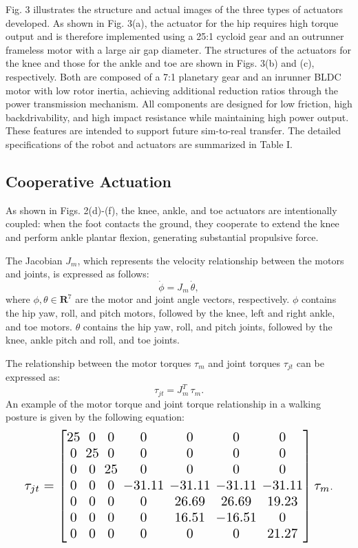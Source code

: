 \documentclass[10pt,twocolumn]{ICCAS}
\begin{document}
Fig. 3 illustrates the structure and actual images of the three
types of actuators developed. As shown in Fig. 3(a), the
actuator for the hip requires high torque output and is
therefore implemented using a 25:1 cycloid gear and an
outrunner frameless motor with a large air gap diameter. The
structures of the actuators for the knee and those for the ankle
and toe are shown in Figs. 3(b) and (c), respectively. Both are
composed of a 7:1 planetary gear and an inrunner BLDC
motor with low rotor inertia, achieving additional reduction
ratios through the power transmission mechanism. All
components are designed for low friction, high
backdrivability, and high impact resistance while maintaining
high power output. These features are intended to support
future sim-to-real transfer. The detailed specifications of
the robot and actuators are summarized in Table I.

\subsection{Cooperative Actuation}
As shown in Figs. 2(d)-(f), the knee, ankle, and toe actuators are intentionally coupled:
when the foot contacts the ground, they cooperate to extend the knee and perform ankle plantar flexion,
generating substantial propulsive force.

The Jacobian $J_m$, which represents the velocity relationship between the motors and joints, is expressed as follows:
\begin{equation}
    \dot{\phi} = J_m \, \dot{\theta},
    \label{eq:jacobian}
\end{equation}
where $\phi, \theta \in \mathbf{R}^{7}$ are the motor and joint angle vectors, respectively.
$\phi$ contains the hip yaw, roll, and pitch motors, followed by the knee, left and right ankle, 
and toe motors. $\theta$ contains the hip yaw, roll, and pitch joints, followed by the knee, ankle pitch and roll, 
and toe joints.

The relationship between the motor torques $\tau_m$ and joint torques $\tau_{jt}$ can be expressed as:
\begin{equation}
    \tau_{jt} = J_m^T \, \tau_m.
    \label{eq:torque}
\end{equation}
An example of the motor torque and joint torque relationship in a walking posture is given by the following equation:
\begin{equation}
    \resizebox{0.92\columnwidth}{!}{$
    \setlength{\arraycolsep}{2pt}
    \tau_{jt} =
    \begin{bmatrix}
    25 & 0 & 0 & 0 & 0 & 0 & 0 \\
    0 & 25 & 0 & 0 & 0 & 0 & 0 \\
    0 & 0 & 25 & 0 & 0 & 0 & 0 \\
    0 & 0 & 0 & -31.11 & -31.11 & -31.11 & -31.11 \\
    0 & 0 & 0 & 0 & 26.69 & 26.69 & 19.23 \\
    0 & 0 & 0 & 0 & 16.51 & -16.51 & 0 \\
    0 & 0 & 0 & 0 & 0 & 0 & 21.27 \\
    \end{bmatrix}
    \tau_m
    $}.
    \label{eq:walking_example}
\end{equation}
    
\end{document}
